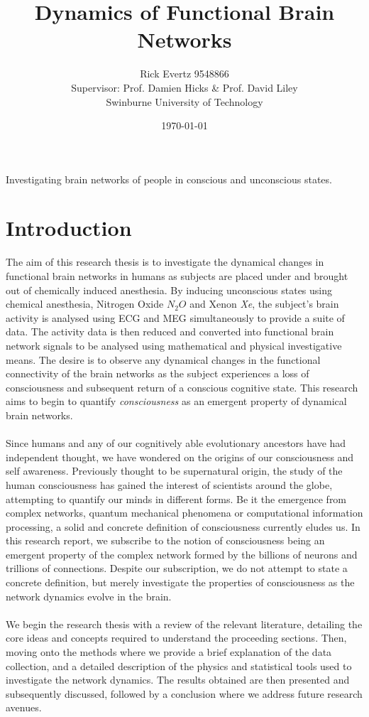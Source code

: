 \documentclass{article}
\def\ni{\noindent}
\begin{document}
\title{\bf{Dynamics of Functional Brain Networks}}
\author{Rick Evertz 9548866\\
Supervisor: Prof. Damien Hicks \& Prof. David Liley\\
Swinburne University of Technology}
\date{\today}
\maketitle
\abstract 
\ni Investigating brain networks of people in conscious and unconscious states.
\pagebreak

\tableofcontents
\pagebreak
\section{Introduction}
The aim of this research thesis is to investigate the dynamical changes in functional brain networks in humans as subjects are placed under and brought out of chemically induced anesthesia. By inducing unconscious states using chemical anesthesia, Nitrogen Oxide $N_2O$ and Xenon \emph{Xe}, the subject's brain activity is analysed using ECG and MEG simultaneously to provide a suite of data. The activity data is then reduced and converted into functional brain network signals to be analysed using mathematical and physical investigative means. The desire is to observe any dynamical changes in the functional connectivity of the brain networks as the subject experiences a loss of consciousness and subsequent return of a conscious cognitive state. This research aims to begin to quantify \emph{consciousness} as an emergent property of dynamical brain networks.
\\
\\
Since humans and any of our cognitively able evolutionary ancestors have had independent thought, we have wondered on the origins of our consciousness and self awareness. Previously thought to be supernatural origin, the study of the human consciousness has gained the interest of scientists around the globe, attempting to quantify our minds in different forms. Be it the emergence from complex networks, quantum mechanical phenomena or computational information processing, a solid and concrete definition of consciousness currently eludes us. In this research report, we subscribe to the notion of consciousness being an emergent property of the complex network formed by the billions of neurons and trillions of connections. Despite our subscription, we do not attempt to state a concrete definition, but merely investigate the properties of consciousness as the network dynamics evolve in the brain.
\\
\\
We begin the research thesis with a review of the relevant literature, detailing the core ideas and concepts required to understand the proceeding sections. Then, moving onto the methods where we provide a brief explanation of the data collection, and a detailed description of the physics and statistical tools used to investigate the network dynamics. The results obtained are then presented and subsequently discussed, followed by a conclusion where we address future research avenues.
\end{document}
